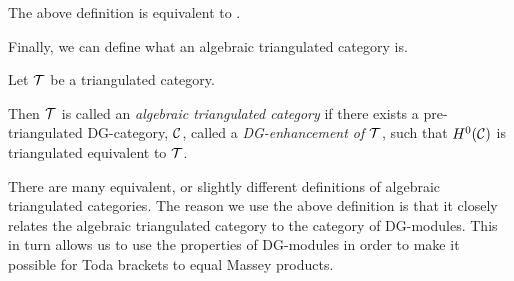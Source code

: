 The above definition is equivalent to \cite[Definition 3.1.1]{Jasso-Muro_2023}.

Finally, we can define what an algebraic triangulated category is.
\begin{definition}
    \label{def:alg_tri_cat}
    Let \( {\mathcal{T}} \) be a triangulated category.

    Then \( {\mathcal{T}} \) is called an \emph{algebraic triangulated category} if there exists a pre-triangulated DG-category, \( {\mathcal{C}} \), called a \emph{DG-enhancement of \( {\mathcal{T}} \)}, such that \( H^0({\mathcal{C}}) \) is triangulated equivalent to \( {\mathcal{T}} \).
\end{definition}

There are many equivalent, or slightly different definitions of algebraic triangulated categories. The reason we use the above definition is that it closely relates the algebraic triangulated category to the category of DG-modules. This in turn allows us to use the properties of DG-modules in order to make it possible for Toda brackets to equal Massey products.